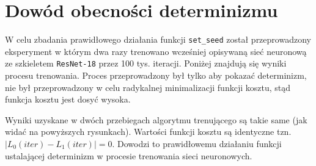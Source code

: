 \newpage

\section{Dowód obecności determinizmu}

W celu zbadania prawidłowego działania funkcji \texttt{set\_seed} został przeprowadzony eksperyment w którym dwa razy trenowano wcześniej opisywaną sieć neuronową ze szkieletem \texttt{ResNet-18} przez 100 tys. iteracji. Poniżej znajdują się wyniki procesu trenowania. Proces przeprowadzony był tylko aby pokazać determinizm, nie był przeprowadzony w celu radykalnej minimalizacji funkcji kosztu, stąd funkcja kosztu jest dosyć wysoka.

\begin{figure}[htbp]
    \centering
    \qquad
\end{figure}

Wyniki uzyskane w dwóch przebiegach algorytmu trenującego są takie same (jak widać na powyższych rysunkach). Wartości funkcji kosztu są identyczne tzn. $|L_0(iter) - L_1(iter)| = 0$. Dowodzi to prawidłowemu działaniu funkcji ustalającej determinizm w procesie trenowania sieci neuronowych.